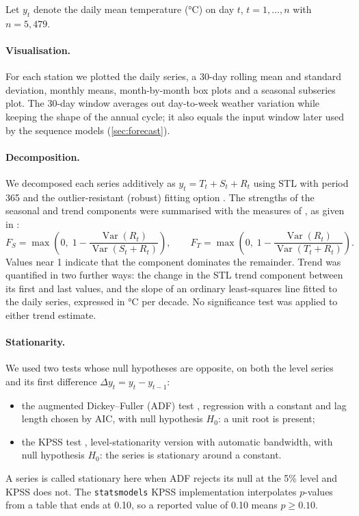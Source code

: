 \documentclass[11pt,a4paper]{article}
\newcommand{\code}[1]{\texttt{#1}}
\begin{document}
Let $y_t$ denote the daily mean temperature (\si{\degreeCelsius}) on day $t$, $t = 1,\dots,n$ with $n = 5{,}479$.

\paragraph{Visualisation.} For each station we plotted the daily series, a 30-day rolling mean and standard deviation, monthly means, month-by-month box plots and a seasonal subseries plot. The 30-day window averages out day-to-week weather variation while keeping the shape of the annual cycle; it also equals the input window later used by the sequence models (\cref{sec:forecast}).

\paragraph{Decomposition.} We decomposed each series additively as $y_t = T_t + S_t + R_t$ using STL with period 365 and the outlier-resistant (robust) fitting option \citep{cleveland1990stl}. The strengths of the seasonal and trend components were summarised with the measures of \citet{wang2006characteristic}, as given in \citet[Section~4.3]{hyndman2021fpp3}:
\begin{equation}
  F_S = \max\!\left(0,\; 1 - \frac{\operatorname{Var}(R_t)}{\operatorname{Var}(S_t + R_t)}\right), \qquad
  F_T = \max\!\left(0,\; 1 - \frac{\operatorname{Var}(R_t)}{\operatorname{Var}(T_t + R_t)}\right).
  \label{eq:strength}
\end{equation}
Values near 1 indicate that the component dominates the remainder. Trend was quantified in two further ways: the change in the STL trend component between its first and last values, and the slope of an ordinary least-squares line fitted to the daily series, expressed in \si{\degreeCelsius} per decade. No significance test was applied to either trend estimate.

\paragraph{Stationarity.} We used two tests whose null hypotheses are opposite, on both the level series and its first difference $\Delta y_t = y_t - y_{t-1}$:
\begin{itemize}
  \item the augmented Dickey--Fuller (ADF) test \citep{dickey1979distribution,said1984testing}, regression with a constant and lag length chosen by AIC, with null hypothesis $H_0$: a unit root is present;
  \item the KPSS test \citep{kwiatkowski1992testing}, level-stationarity version with automatic bandwidth, with null hypothesis $H_0$: the series is stationary around a constant.
\end{itemize}
A series is called stationary here when ADF rejects its null at the 5\% level and KPSS does not. The \code{statsmodels} KPSS implementation \citep{seabold2010statsmodels} interpolates $p$-values from a table that ends at 0.10, so a reported value of 0.10 means $p \geq 0.10$.
\end{document}

